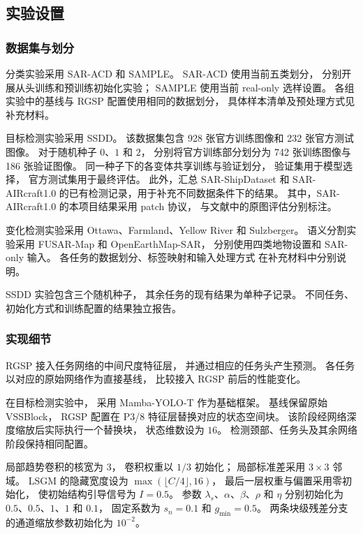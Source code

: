 \documentclass[journal]{IEEEtran}
\begin{document}
\subsection{实验设置}
\label{sec:experimental_settings}

\subsubsection{数据集与划分}
\label{sec:datasets}

分类实验采用 SAR-ACD 和 SAMPLE。
SAR-ACD 使用当前五类划分，
分别开展从头训练和预训练初始化实验；
SAMPLE 使用当前 real-only 选样设置。
各组实验中的基线与 RGSP 配置使用相同的数据划分，
具体样本清单及预处理方式见补充材料。

目标检测实验采用 SSDD。
该数据集包含 928 张官方训练图像和 232 张官方测试图像。
对于随机种子 $0$、$1$ 和 $2$，
分别将官方训练部分划分为
742 张训练图像与 186 张验证图像。
同一种子下的各变体共享训练与验证划分，
验证集用于模型选择，
官方测试集用于最终评估。
此外，汇总 SAR-ShipDataset 和 SAR-AIRcraft1.0
的已有检测记录，用于补充不同数据条件下的结果。
其中，SAR-AIRcraft1.0 的本项目结果采用 patch 协议，
与文献中的原图评估分别标注。

变化检测实验采用
Ottawa、Farmland、Yellow River 和 Sulzberger。
语义分割实验采用
FUSAR-Map 和 OpenEarthMap-SAR，
分别使用四类地物设置和 SAR-only 输入。
各任务的数据划分、标签映射和输入处理方式
在补充材料中分别说明。

SSDD 实验包含三个随机种子，
其余任务的现有结果为单种子记录。
不同任务、初始化方式和训练配置的结果独立报告。

\subsubsection{实现细节}
\label{sec:implementation_details}

RGSP 接入任务网络的中间尺度特征层，
并通过相应的任务头产生预测。
各任务以对应的原始网络作为直接基线，
比较接入 RGSP 前后的性能变化。

在目标检测实验中，
采用 Mamba-YOLO-T 作为基础框架。
基线保留原始 VSSBlock，
RGSP 配置在 P3/8 特征层替换对应的状态空间块。
该阶段经网络深度缩放后实际执行一个替换块，
状态维数设为 $16$。
检测颈部、任务头及其余网络阶段保持相同配置。

局部趋势卷积的核宽为 $3$，
卷积权重以 $1/3$ 初始化；
局部标准差采用 $3\times3$ 邻域。
LSGM 的隐藏宽度设为
$\max(\lfloor C/4\rfloor,16)$，
最后一层权重与偏置采用零初始化，
使初始结构引导信号为 $I=0.5$。
参数 $\lambda_s$、$\alpha$、$\beta$、$\rho$ 和 $\eta$
分别初始化为 $0.5$、$0.5$、$1$、$1$ 和 $0.1$，
固定系数为 $s_n=0.1$ 和 $g_{\min}=0.5$。
两条块级残差分支的通道缩放参数初始化为 $10^{-2}$。
\end{document}
